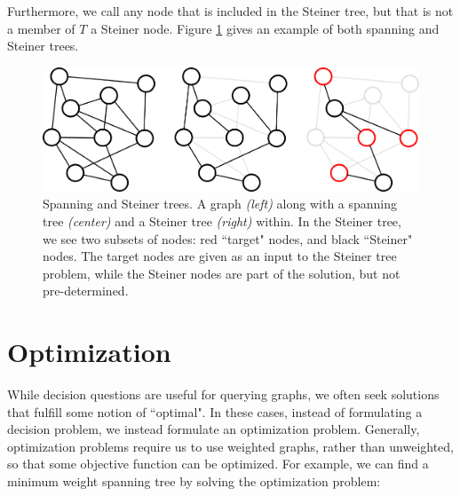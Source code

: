 \documentclass[12pt,twoside]{reedthesis}
\theoremstyle{definition}
\begin{document}
   \bigbreak

   Furthermore, we call any node that is included in the Steiner tree, but that is not a member of $T$ a Steiner node. Figure \ref{fig:graph1} gives an example of both spanning and Steiner trees.

   \begin{figure}[!h]
     \begin{center}
       \includegraphics[width=\textwidth]{graph1}
     \caption[Spanning and Steiner trees.]{Spanning and Steiner trees. A graph \textit{(left)} along with a spanning tree \textit{(center)} and a Steiner tree \textit{(right)} within. In the Steiner tree, we see two subsets of nodes: red ``target" nodes, and black ``Steiner" nodes. The target nodes are given as an input to the Steiner tree problem, while the Steiner nodes are part of the solution, but not pre-determined.}
     \label{fig:graph1}
     \end{center}
   \end{figure}

 \section{Optimization}
 While decision questions are useful for querying graphs, we often seek solutions that fulfill some notion of ``optimal". In these cases, instead of formulating a decision problem, we instead formulate an optimization problem. Generally, optimization problems require us to use weighted graphs, rather than unweighted, so that some objective function can be optimized. For example, we can find a minimum weight spanning tree by solving the optimization problem:

 \bigbreak
\end{document}
